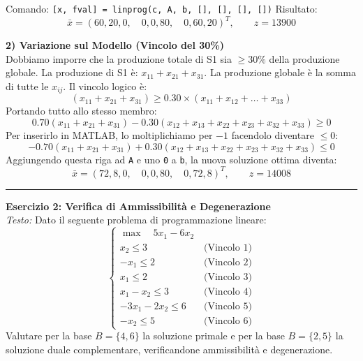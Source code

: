 \documentclass[12pt, a4paper]{article}
\begin{document}
	Comando: \texttt{[x, fval] = linprog(c, A, b, [], [], [], [])}
	Risultato:
	\[
	\bar{x} = (60, 20, 0, \quad 0, 0, 80, \quad 0, 60, 20)^T, \qquad z = 13900
	\]
	
	\textbf{2) Variazione sul Modello (Vincolo del 30\%)}\\
	Dobbiamo imporre che la produzione totale di S1 sia $\geq 30\%$ della produzione globale.
	La produzione di S1 è: $x_{11} + x_{21} + x_{31}$.
	La produzione globale è la somma di tutte le $x_{ij}$.
	Il vincolo logico è:
	\[
	(x_{11} + x_{21} + x_{31}) \geq 0.30 \times (x_{11} + x_{12} + \dots + x_{33})
	\]
	Portando tutto allo stesso membro:
	\[
	0.70(x_{11} + x_{21} + x_{31}) - 0.30(x_{12} + x_{13} + x_{22} + x_{23} + x_{32} + x_{33}) \geq 0
	\]
	Per inserirlo in MATLAB, lo moltiplichiamo per $-1$ facendolo diventare $\leq 0$:
	\[
	-0.70(x_{11} + x_{21} + x_{31}) + 0.30(x_{12} + x_{13} + x_{22} + x_{23} + x_{32} + x_{33}) \leq 0
	\]
	Aggiungendo questa riga ad \texttt{A} e uno \texttt{0} a \texttt{b}, la nuova soluzione ottima diventa:
	\[
	\bar{x} = (72, 8, 0, \quad 0, 0, 80, \quad 0, 72, 8)^T, \qquad z = 14008
	\]
	
	\vspace{0.6cm}
	\hrule
	\vspace{0.4cm}
	
	\textbf{Esercizio 2: Verifica di Ammissibilità e Degenerazione}\\
	\textit{Testo:} Dato il seguente problema di programmazione lineare:
	\[
	\begin{cases}
		\max \quad 5x_1 - 6x_2 \\[6pt]
		x_2 \leq 3 \quad &\text{(Vincolo 1)} \\
		-x_1 \leq 2 \quad &\text{(Vincolo 2)} \\
		x_1 \leq 2 \quad &\text{(Vincolo 3)} \\
		x_1 - x_2 \leq 3 \quad &\text{(Vincolo 4)} \\
		-3x_1 - 2x_2 \leq 6 \quad &\text{(Vincolo 5)} \\
		-x_2 \leq 5 \quad &\text{(Vincolo 6)}
	\end{cases}
	\]
	Valutare per la base $B = \{4, 6\}$ la soluzione primale e per la base $B = \{2, 5\}$ la soluzione duale complementare, verificandone ammissibilità e degenerazione.
	
\end{document}
